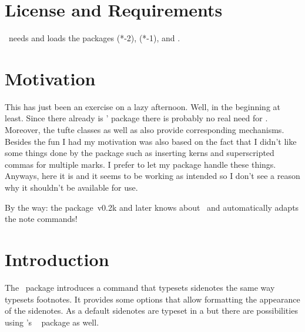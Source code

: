 \documentclass[load-preamble+]{cnltx-doc}
\makeatletter
\newcommand*\defaultsidenotes{%
  \setsidenotes{
    note-mark-format = \@textsuperscript{\normalfont\normalcolor##1},
    text-format      = \normalfont\normalcolor\footnotesize
  }}
\makeatother
\begin{document}
\section{License and Requirements}\label{sec:license}
\license

\snotez\ needs and loads the packages
\sidenote(*-2){\textcite{pkg:etoolbox}},
\sidenote(*-1){\textcite{pkg:pgfopts}},
 and
.

\section{Motivation}\label{sec:motivation}
This has just been an exercise on a lazy
afternoon.  Well,
in the beginning at least.  Since there already is \thomas' 
package there is probably no real need for
\snotez.  Moreover, the tufte classes as well
as  also provide corresponding
mechanisms.  Besides the fun I had my motivation was also based on the fact
that I didn't like some things done by the  package such as
inserting kerns and superscripted commas for multiple marks.  I prefer to let
my  package handle these things.
Anyways, here it is and it seems to be working as intended so I don't see a
reason why it shouldn't be available for use.

By the way: the  package~v0.2k and later knows about \snotez\ and
automatically adapts the note commands!

\section{Introduction}\label{sec:introduction}
The \snotez\ package introduces a  command%
\begingroup\defaultsidenotes
{}
\endgroup
that typesets sidenotes the same way  typesets footnotes.  It
provides some options that allow formatting the appearance of the
sidenotes.  As a default sidenotes
are typeset in a  but there are possibilities using \kohm's
~\cite{pkg:marginnote} package as well.
\end{document}

